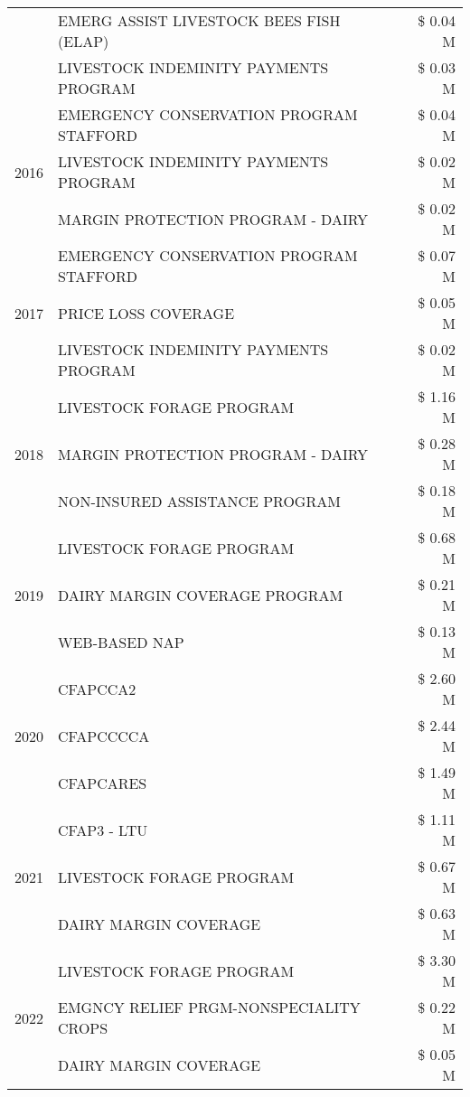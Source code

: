 \begin{tabular}{llr}
 & EMERG ASSIST LIVESTOCK BEES FISH (ELAP) & \$ 0.04 M \\
 & LIVESTOCK INDEMINITY PAYMENTS PROGRAM & \$ 0.03 M \\
\cline{1-3}
\multirow[t]{3}{*}{2016} & EMERGENCY CONSERVATION PROGRAM STAFFORD & \$ 0.04 M \\
 & LIVESTOCK INDEMINITY PAYMENTS PROGRAM & \$ 0.02 M \\
 & MARGIN PROTECTION PROGRAM - DAIRY & \$ 0.02 M \\
\cline{1-3}
\multirow[t]{3}{*}{2017} & EMERGENCY CONSERVATION PROGRAM STAFFORD & \$ 0.07 M \\
 & PRICE LOSS COVERAGE & \$ 0.05 M \\
 & LIVESTOCK INDEMINITY PAYMENTS PROGRAM & \$ 0.02 M \\
\cline{1-3}
\multirow[t]{3}{*}{2018} & LIVESTOCK FORAGE PROGRAM & \$ 1.16 M \\
 & MARGIN PROTECTION PROGRAM - DAIRY & \$ 0.28 M \\
 & NON-INSURED ASSISTANCE PROGRAM & \$ 0.18 M \\
\cline{1-3}
\multirow[t]{3}{*}{2019} & LIVESTOCK FORAGE PROGRAM & \$ 0.68 M \\
 & DAIRY MARGIN COVERAGE PROGRAM & \$ 0.21 M \\
 & WEB-BASED NAP & \$ 0.13 M \\
\cline{1-3}
\multirow[t]{3}{*}{2020} & CFAPCCA2 & \$ 2.60 M \\
 & CFAPCCCCA & \$ 2.44 M \\
 & CFAPCARES & \$ 1.49 M \\
\cline{1-3}
\multirow[t]{3}{*}{2021} & CFAP3 - LTU & \$ 1.11 M \\
 & LIVESTOCK FORAGE PROGRAM & \$ 0.67 M \\
 & DAIRY MARGIN COVERAGE & \$ 0.63 M \\
\cline{1-3}
\multirow[t]{3}{*}{2022} & LIVESTOCK FORAGE PROGRAM & \$ 3.30 M \\
 & EMGNCY RELIEF PRGM-NONSPECIALITY CROPS & \$ 0.22 M \\
 & DAIRY MARGIN COVERAGE & \$ 0.05 M \\
\cline{1-3}
\bottomrule
\end{tabular}
